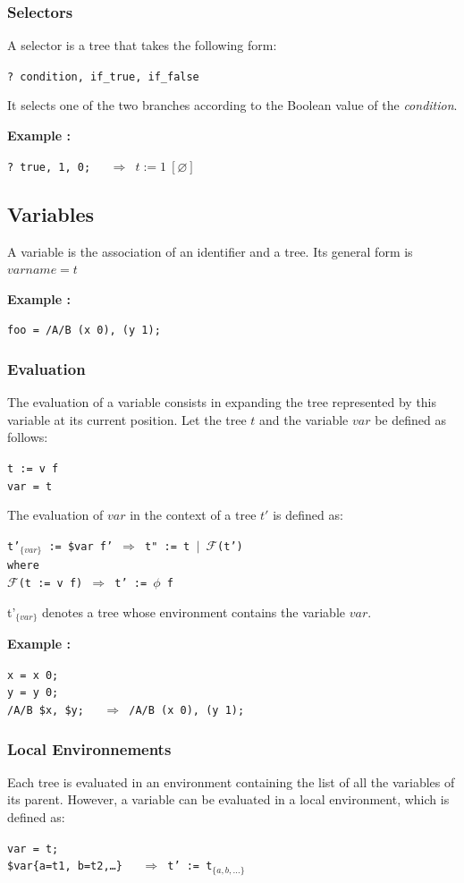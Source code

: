 \documentclass{article}
\newcommand{\exemple}	{\vspace*{1mm}\hspace*{-4mm}\textbf{Example :}}
\newcommand{\code}	[2][0.9]		{\vspace{0mm}\begin{center}\colorbox{mygrey}{
							\begin{minipage}[t]{#1\columnwidth} 
							{\small \texttt{#2}}
							\end{minipage}}\end{center}}
\newcommand{\op}	[1]		{\vspace{0mm}\begin{center}\colorbox{mygrey}{
							\begin{minipage}[t]{0.9\columnwidth} 
							{\small \texttt{#1}}
							\end{minipage}}\end{center}}
\newcommand{\nulltree}	{\ensuremath{\varnothing}}
\newcommand{\seq}		{\ensuremath{|}}
\newcommand{\foret}		{\ensuremath{\phi}}
\newcommand{\toforet}	{\ensuremath{\mathcal{F}}}
\newcommand{\etc}		{…}
\begin{document}
\subsubsection{Selectors}

A selector is a tree that takes the following form:
\code{? condition, if\_true, if\_false}
It selects one of the two branches according to the Boolean value of the \emph {condition}.

\exemple
\code{? true, 1, 0; \ \  $\Rightarrow$ $t := 1\ [\nulltree]$}


\subsection{Variables}

A variable is the association of an identifier and a tree. Its general form is
$varname = t$

\exemple
\code{foo = /A/B (x 0), (y 1); }

\subsubsection{Evaluation}

The evaluation of a variable consists in expanding the tree represented by this variable at its current position.
Let the tree $t$ and the variable $var$ be defined as follows:
\op{t :=  v f\\
var = t
}
The evaluation of $var$ in the context of a tree $t'$ is defined as:
\op{t'$_{\{var\}}$ :=  \$var f' $\Rightarrow$ t" := t \seq\ \toforet(t') \\
where \\
\toforet(t := v f) $\Rightarrow$ t' := \foret\ f
}
t'$_{\{var\}}$ denotes a tree whose environment contains the variable $var$.


\exemple
\code{x = x 0;\\
y = y 0;\\
/A/B \$x, \$y; \ \ $\Rightarrow$  /A/B (x 0), (y 1);}


\subsubsection{Local Environnements}

Each tree is evaluated in an environment containing the list of all the variables of its parent. However, a variable can be evaluated in a local environment, which is defined as:
\code{var = t;\\
\$var\{a=t1, b=t2,\etc\} \ \ $\Rightarrow$  t' := t$_{\{a, b,\etc\}}$}
\end{document}
